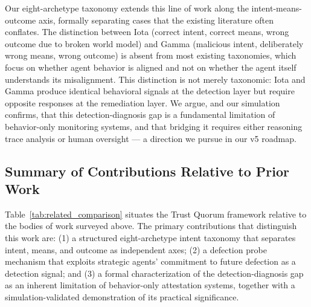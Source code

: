 Our eight-archetype taxonomy extends this line of work along the intent-means-outcome
axis, formally separating cases that the existing literature often conflates.  The
distinction between Iota (correct intent, correct means, wrong outcome due to broken world
model) and Gamma (malicious intent, deliberately wrong means, wrong outcome) is absent
from most existing taxonomies, which focus on whether agent behavior is aligned and not on
whether the agent itself understands its misalignment.  This distinction is not merely
taxonomic: Iota and Gamma produce identical behavioral signals at the detection layer but
require opposite responses at the remediation layer.  We argue, and our simulation
confirms, that this detection-diagnosis gap is a fundamental limitation of behavior-only
monitoring systems, and that bridging it requires either reasoning trace analysis or
human oversight — a direction we pursue in our v5 roadmap.

\subsection{Summary of Contributions Relative to Prior Work}

Table~\ref{tab:related_comparison} situates the Trust Quorum framework relative to the
bodies of work surveyed above.  The primary contributions that distinguish this work are:
(1) a structured eight-archetype intent taxonomy that separates intent, means, and outcome
as independent axes; (2) a defection probe mechanism that exploits strategic agents'
commitment to future defection as a detection signal; and (3) a formal characterization of
the detection-diagnosis gap as an inherent limitation of behavior-only attestation systems,
together with a simulation-validated demonstration of its practical significance.

